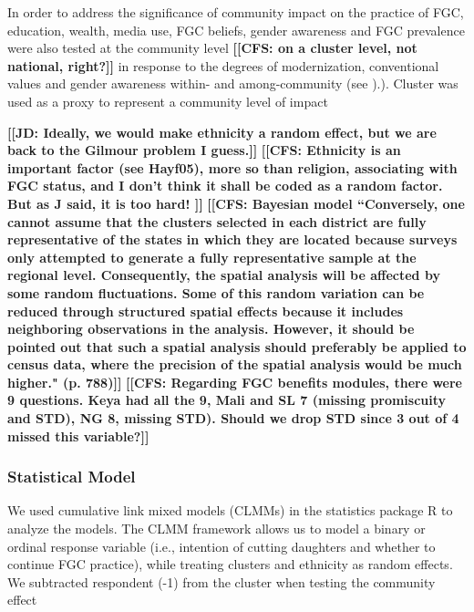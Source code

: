 \documentclass[12pt,]{article}
\newcommand{\comment}[1]{\textbf{[[#1]]}}
\newcommand{\cfcmt}[1]{\comment{CFS: #1}}
\newcommand{\jdcmt}[1]{\comment{JD: #1}}
\begin{document}
{In order to address the significance of community impact on the practice of FGC, education, wealth, media use, FGC beliefs, gender awareness and FGC prevalence were also tested at the community level \cfcmt{on a cluster level, not national, right?} in response to the degrees of modernization, conventional values and gender awareness within- and among-community (see \cite{Achi14, BoylMcMo02, Hayf05, KandNwak09, ModrLiu13, Moor13, OdukAfol17, Youn02}).}).  Cluster  was used as a proxy to represent a community level of impact \cite{AligRen06, Hayf05, Krav02}

\jdcmt{Ideally, we would make ethnicity a random effect, but we are back to the Gilmour problem I guess.} \cfcmt{Ethnicity is an important factor (see Hayf05), more so than religion, associating with FGC status, and I don't think it shall be coded as a random factor.  But as J said, it is too hard! } %
\cfcmt{Bayesian model \cite{KandNwak09} ``Conversely, one cannot assume that the clusters selected in each district are fully representative of the states in which they are located because surveys only attempted to generate a fully representative sample at the regional level. Consequently, the spatial analysis will be affected by some random fluctuations.  Some of this random variation can be reduced through structured spatial effects because it includes neighboring observations in the analysis. However, it should be pointed out that such a spatial analysis should preferably be applied to census data, where the precision of the spatial analysis would be much higher." (p. 788)}
\cfcmt{Regarding FGC benefits modules, there were 9 questions.  Keya had all the 9, Mali and SL 7 (missing promiscuity and STD), NG 8, missing STD).  Should we drop STD since 3 out of 4 missed this variable?}

\subsubsection{Statistical Model}\label{statistical-model}

We used cumulative link mixed models (CLMMs) in the statistics package R \cite{Rstats,Rpackage_ordinal} to analyze the models.  The CLMM framework allows us to model a binary or ordinal response variable (i.e., intention of cutting daughters and whether to continue FGC practice), while treating clusters and ethnicity as random effects.  
We subtracted respondent (-1) from the cluster when testing the community effect 
\end{document}
